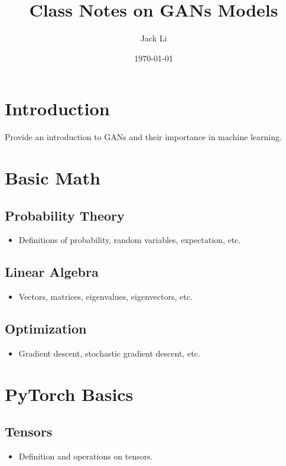 \documentclass{article}
\title{Class Notes on GANs Models}
\author{Jack Li}
\date{\today}
\begin{document}
\maketitle

\tableofcontents

\section{Introduction}
\label{sec:introduction}
Provide an introduction to GANs and their importance in machine learning.

\section{Basic Math}
\label{sec:basic-math}
\subsection{Probability Theory}
\begin{itemize}
    \item Definitions of probability, random variables, expectation, etc.
\end{itemize}

\subsection{Linear Algebra}
\begin{itemize}
    \item Vectors, matrices, eigenvalues, eigenvectors, etc.
\end{itemize}

\subsection{Optimization}
\begin{itemize}
    \item Gradient descent, stochastic gradient descent, etc.
\end{itemize}

\section{PyTorch Basics}
\label{sec:pytorch-basics}
\subsection{Tensors}
\begin{itemize}
    \item Definition and operations on tensors.
\end{itemize}
\end{document}
